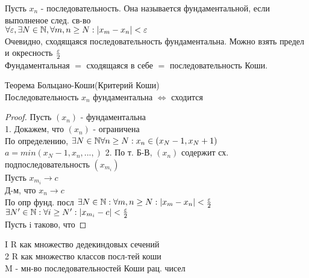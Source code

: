 \begin{definition}
	Пусть $x_n$ - последовательность. Она называется фундаментальной, если выполненое след. св-во \\
	$ \forall \varepsilon,  \exists N \in \mathbb{N}, \forall m,n \geq N : | x_m - x_n | < \varepsilon $\\
	Очевидно, сходящаяся последовательность фундаментальна. Можно взять предел и окресность $ \frac{\varepsilon}{2} $ \\
	Фундаментальная $=$ сходящаяся в себе $=$ последовательность Коши.
\end{definition}
\begin{theorem}
	Теорема Больцано-Коши(Критерий Коши) \\
	Последовательность $x_n$ фундаментальна $ \Leftrightarrow $ сходится
	\begin{proof}
		Пусть $ (x_n) $ - фундаментальна \\
		1. Докажем, что $(x_n)$ - ограничена \\
		По определению, $  \exists N \in \mathbb{N} \forall n \geq N : x_n \in (x_{N} - 1, x_N +1)$\\
		$ a = min(x_N - 1, x_n, ..., )$ %
		2. По т. Б-В, $ (x_n)$ содержит сх. подпоследовательность $(x_{m_i}) $ \\
		Пусть $ x_{m_i} \rightarrow c $ \\
		Д-м, что $ x_n \rightarrow c $ \\
		По опр фунд. посл $ \exists N \in \mathbb{N}  : \forall m, n \geq N : |x_m-x_n| < \frac{\varepsilon}{2}$ \\
		$\exists N' \in \mathbb{N} : \forall i \geq N' : |x_{m_i} -c | < \frac{\varepsilon}{2} $ \\
		Пусть i таково, что %
		
	\end{proof}
\end{theorem}
I R как множество дедекиндовых сечений\\
2 R как множество классов посл-тей коши\\
M - мн-во последовательностей Коши рац. чисел %

